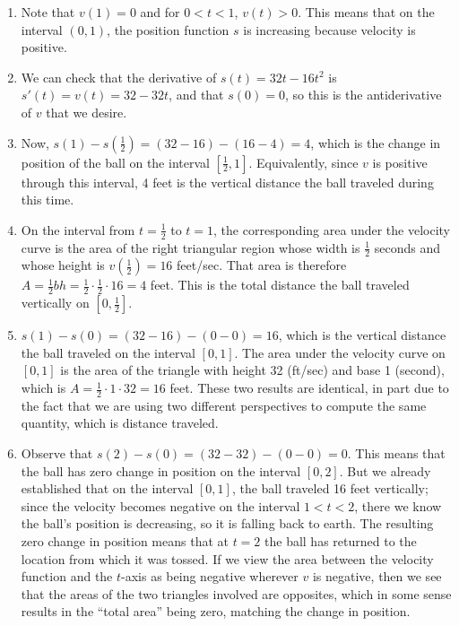 \begin{activitySolution}
\begin{enumerate}
	\item Note that $v(1) = 0$ and for $0 < t < 1$, $v(t) > 0$.  This means that on the interval $(0,1)$, the position function $s$ is increasing because velocity is positive.
	\item We can check that the derivative of $s(t) = 32t - 16t^2$ is $s'(t) = v(t) = 32 - 32t$, and that $s(0) = 0$, so this is the antiderivative of $v$ that we desire.
	\item Now, $s(1) - s(\frac{1}{2}) = (32 - 16) - (16 - 4) = 4$, which is the change in position of the ball on the interval $[\frac{1}{2},1]$.  Equivalently, since $v$ is positive through this interval, 4 feet is the vertical distance the ball traveled during this time.
	\item On the interval from $t = \frac{1}{2}$ to $t = 1$, the corresponding area under the velocity curve is the area of the right triangular region whose width is $\frac{1}{2}$ seconds and whose height is $v(\frac{1}{2}) = 16$ feet/sec.  That area is therefore $A = \frac{1}{2} bh = \frac{1}{2} \cdot \frac{1}{2} \cdot 16 = 4$ feet.  This is the total distance the ball traveled vertically on $[0,\frac{1}{2}]$.
	\item $s(1) - s(0) = (32 - 16) - (0-0) = 16$, which is the vertical distance the ball traveled on the interval $[0,1]$.  The area under the velocity curve on $[0,1]$ is the area of the triangle with height 32 (ft/sec) and base 1 (second), which is $A = \frac{1}{2} \cdot 1 \cdot 32 = 16$ feet.  These two results are identical, in part due to the fact that we are using two different perspectives to compute the same quantity, which is distance traveled.
	\item Observe that $s(2) - s(0) = (32 - 32) - (0 - 0) = 0$.  This means that the ball has zero change in position on the interval $[0,2]$.  But we already established that on the interval $[0,1]$, the ball traveled 16 feet vertically; since the velocity becomes negative on the interval $1 < t < 2$, there we know the ball's position is decreasing, so it is falling back to earth.  The resulting zero change in position means that at $t = 2$ the ball has returned to the location from which it was tossed.  If we view the area between the velocity function and the $t$-axis as being negative wherever $v$ is negative, then we see that the areas of the two triangles involved are opposites, which in some sense results in the ``total area'' being zero, matching the change in position.
\end{enumerate}
\end{activitySolution}
\aftera

